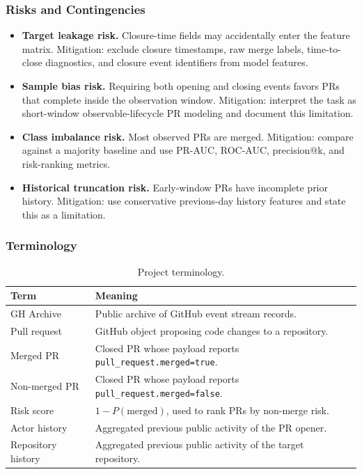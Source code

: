 \subsubsection*{Risks and Contingencies}

\begin{itemize}
    \item \textbf{Target leakage risk.} Closure-time fields may accidentally enter the feature matrix.
        Mitigation: exclude closure timestamps, raw merge labels, time-to-close diagnostics, and closure
        event identifiers from model features.
    \item \textbf{Sample bias risk.} Requiring both opening and closing events favors PRs that complete
        inside the observation window. Mitigation: interpret the task as short-window observable-lifecycle PR
        modeling and document this limitation.
    \item \textbf{Class imbalance risk.} Most observed PRs are merged. Mitigation: compare against a majority
        baseline and use PR-AUC, ROC-AUC, precision@k, and risk-ranking metrics.
    \item \textbf{Historical truncation risk.} Early-window PRs have incomplete prior history. Mitigation:
        use conservative previous-day history features and state this as a limitation.
\end{itemize}

\subsubsection*{Terminology}

\begin{table}[H]
    \centering
    \caption{Project terminology.}
    \begin{tabularx}{\textwidth}{lX}
        \toprule
        Term & Meaning \\
        \midrule
        GH Archive & Public archive of GitHub event stream records. \\
        Pull request & GitHub object proposing code changes to a repository. \\
        Merged PR & Closed PR whose payload reports \texttt{pull\_request.merged=true}. \\
        Non-merged PR & Closed PR whose payload reports \texttt{pull\_request.merged=false}. \\
        Risk score & \(1 - P(\text{merged})\), used to rank PRs by non-merge risk. \\
        Actor history & Aggregated previous public activity of the PR opener. \\
        Repository history & Aggregated previous public activity of the target repository. \\
        \bottomrule
    \end{tabularx}
\end{table}

